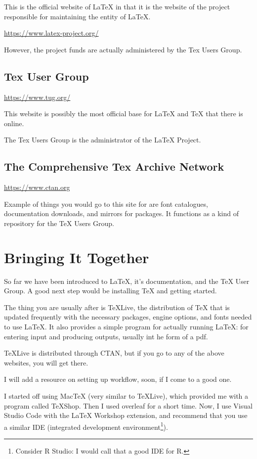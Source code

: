 \documentclass[11pt, oneside]{memoir}
\begin{document}
This is the official website of LaTeX in that it is the website of the project responsible for maintaining the entity of LaTeX.

\url{https://www.latex-project.org/}

However, the project funds are actually administered by the Tex Users Group.

\subsection{Tex User Group}

\url{https://www.tug.org/}

This website is possibly the most official base for LaTeX and TeX that there is online. 

The Tex Users Group is the administrator of the LaTeX Project.

\subsection{The Comprehensive Tex Archive Network}
\url{https://www.ctan.org}

Example of things you would go to this site for are font catalogues, documentation downloads, and mirrors for packages. It functions as a kind of repository for the TeX Users Group.

\section{Bringing It Together}

So far we have been introduced to LaTeX, it's documentation, and the TeX User Group. A good next step would be installing TeX and getting started.

The thing you are usually after is TeXLive, the distribution of TeX that is updated frequently with the necessary packages, engine options, and fonts needed to use LaTeX. It also provides a simple program for actually running LaTeX: for entering input and producing outputs, usually int he form of a pdf.

TeXLive is distributed through CTAN, but if you go to any of the above websites, you will get there.

I will add a resource on setting up workflow, soon, if I come to a good one.

I started off using MacTeX (very similar to TeXLive), which provided me with a program called TeXShop. Then I used overleaf for a short time. Now, I use Visual Studio Code with the LaTeX Workshop extension, and recommend that you use a similar IDE (integrated development environment\footnote{Consider R Studio: I would call that a good IDE for R.}).
\end{document}
